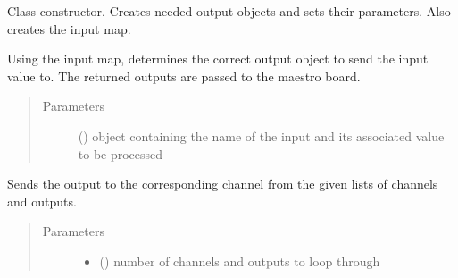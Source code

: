 \documentclass[letterpaper,10pt,english]{sphinxmanual}
\begin{document}
\begin{fulllineitems}
\sphinxAtStartPar
{}

\begin{fulllineitems}
\label{\detokenize{movementmap:MovementMap.MovementMap.__init__}}
\sphinxAtStartPar
Class constructor. Creates needed output objects and sets their parameters. Also 
creates the input map.

\end{fulllineitems}


\begin{fulllineitems}
\label{\detokenize{movementmap:MovementMap.MovementMap.process_input}}
\sphinxAtStartPar
Using the input map, determines the correct output object to send the input value to. 
The returned outputs are passed to the maestro board.
\begin{quote}\begin{description}
\item[{Parameters}] \leavevmode
\sphinxAtStartPar
{} ({\hyperref[\detokenize{manualcontrol:manualControl.ControllerEvent}]{}}) \textendash{} object containing the name of the input and its associated value 
to be processed

\end{description}\end{quote}

\end{fulllineitems}


\begin{fulllineitems}
\label{\detokenize{movementmap:MovementMap.MovementMap.send_outputs}}
\sphinxAtStartPar
Sends the output to the corresponding channel from the given lists of channels and
outputs.
\begin{quote}\begin{description}
\item[{Parameters}] \leavevmode\begin{itemize}
\item {} 
\sphinxAtStartPar
{} () \textendash{} number of channels and outputs to loop through


\end{itemize}
\end{description}
\end{quote}
\end{fulllineitems}
\end{fulllineitems}
\end{document}
